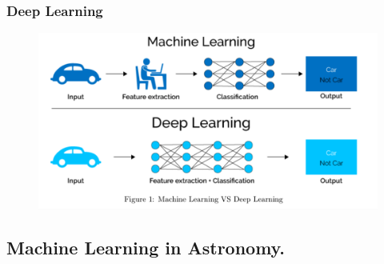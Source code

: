\documentclass{beamer}
\begin{document}
\begin{frame}
 \frametitle{Deep Learning}
 \begin{figure}[ht!]
 \centering
 \includegraphics[scale=0.15]{deep.png}
\end{figure}
\end{frame}









\subsection{Machine Learning in Astronomy.}
\frame{
\tableofcontents[ 
    currentsubsection, 
    sectionstyle=show/hide, 
    sectionstyle=show/shaded, 
    ] 
}
\end{document}
